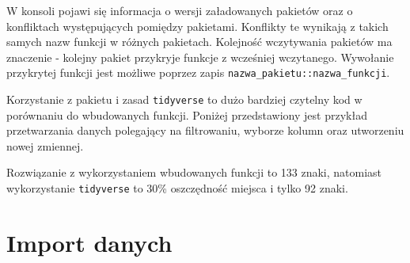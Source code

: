 \documentclass[
  letterpaper,
  DIV=11,
  numbers=noendperiod]{scrreprt}
\newenvironment{Shaded}{\begin{snugshade}}{\end{snugshade}}
\newcommand{\AttributeTok}[1]{\textcolor[rgb]{0.40,0.45,0.13}{#1}}
\newcommand{\CommentTok}[1]{\textcolor[rgb]{0.37,0.37,0.37}{#1}}
\newcommand{\DecValTok}[1]{\textcolor[rgb]{0.68,0.00,0.00}{#1}}
\newcommand{\FunctionTok}[1]{\textcolor[rgb]{0.28,0.35,0.67}{#1}}
\newcommand{\NormalTok}[1]{\textcolor[rgb]{0.00,0.23,0.31}{#1}}
\newcommand{\OtherTok}[1]{\textcolor[rgb]{0.00,0.23,0.31}{#1}}
\newcommand{\SpecialCharTok}[1]{\textcolor[rgb]{0.37,0.37,0.37}{#1}}
\newcommand{\StringTok}[1]{\textcolor[rgb]{0.13,0.47,0.30}{#1}}
\begin{document}
W konsoli pojawi się informacja o wersji załadowanych pakietów oraz o
konfliktach występujących pomiędzy pakietami. Konflikty te wynikają z
takich samych nazw funkcji w różnych pakietach. Kolejność wczytywania
pakietów ma znaczenie - kolejny pakiet przykryje funkcje z wcześniej
wczytanego. Wywołanie przykrytej funkcji jest możliwe poprzez zapis
\texttt{nazwa\_pakietu::nazwa\_funkcji}.

Korzystanie z pakietu i zasad \texttt{tidyverse} to dużo bardziej
czytelny kod w porównaniu do wbudowanych funkcji. Poniżej przedstawiony
jest przykład przetwarzania danych polegający na filtrowaniu, wyborze
kolumn oraz utworzeniu nowej zmiennej.

\begin{Shaded}
\end{Shaded}

Rozwiązanie z wykorzystaniem wbudowanych funkcji to 133 znaki, natomiast
wykorzystanie \texttt{tidyverse} to 30\% oszczędność miejsca i tylko 92
znaki.

\hypertarget{import-danych}{%
\section{Import danych}\label{import-danych}}
\end{document}
